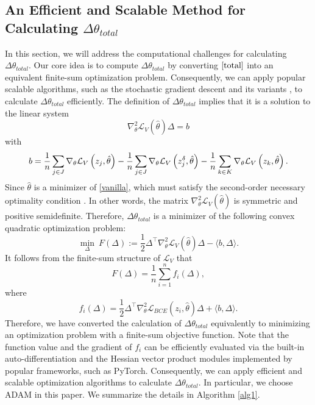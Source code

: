 \subsection{An Efficient and Scalable Method for Calculating $\Delta\theta_{total}$}
In this section, we will address the computational challenges for calculating $\Delta\theta_{total}$. Our core idea is to compute $\Delta\theta_{total}$ by converting $\eqref{total}$ into an equivalent finite-sum optimization problem. Consequently, we can apply popular scalable algorithms, such as the stochastic gradient descent \cite{robbins1951stochastic} and its variants \cite{duchi2011adaptive,kingma2014adam,johnson2013accelerating}, to calculate $\Delta\theta_{total}$ efficiently. The definition of $\Delta\theta_{total}$ implies that it is a solution to the linear system 
\begin{equation}
\label{eq: Equiv-ls}
    \nabla^2_{\theta}\mathcal{L}_V(\hat{\theta}) \Delta = b
\end{equation}
with
\begin{equation}
\label{def-b}
\small
b = \frac{1}{n}\sum_{j \in J} \nabla_\theta \mathcal{L}_{{V}}\left(z_j, \hat{\theta}\right) - \frac{1}{n}\sum_{j \in J} \nabla_\theta \mathcal{L}_{{V}}\left(z_j^\delta, \hat{\theta}\right) - \frac{1}{n}\sum_{k \in K} \nabla_\theta \mathcal{L}_{{V}}\left(z_k, \hat{\theta}\right).
\end{equation}
Since $\hat{\theta}$ is a minimizer of \eqref{vanilla}, which must satisfy the second-order necessary optimality condition \cite{nocedal1999numerical}. In other words, the matrix $\nabla^2_{\theta}\mathcal{L}_V(\hat{\theta})$ is symmetric and positive semidefinite. Therefore, $\Delta\theta_{total}$ is a minimizer of the following convex quadratic optimization problem:
\begin{equation}
\mathop{\min}_{\Delta} ~ F(\Delta) := \frac{1}{2}\Delta^{\top} \nabla^2_{\theta}\mathcal{L}_V(\hat{\theta}) \Delta - \langle b, \Delta \rangle.
\end{equation}
It follows from the finite-sum structure of $\mathcal{L}_V$ that
\begin{equation}
\label{eq: finite-sum}
    F(\Delta) = \frac{1}{n}\sum_{i = 1}^n f_i(\Delta),
\end{equation}
where
\begin{equation}
\label{eq: fun-fi}
f_i(\Delta) = \frac{1}{2} \Delta^{\top} \nabla_{\theta}^2\mathcal{L}_{BCE}(z_i, \hat{\theta}) \Delta + \langle b, \Delta \rangle.
\end{equation}
Therefore, we have converted the calculation of $\Delta\theta_{total}$ equivalently to minimizing an optimization problem with a finite-sum objective function. Note that the function value and the gradient of $f_i$ can be efficiently evaluated via the built-in auto-differentiation and the Hessian vector product modules implemented by popular frameworks, such as PyTorch. Consequently, we can apply efficient and scalable optimization algorithms to calculate $\Delta\theta_{total}$. In particular, we choose ADAM \cite{kingma2014adam} in this paper. We summarize the details in Algorithm \ref{alg1}.

